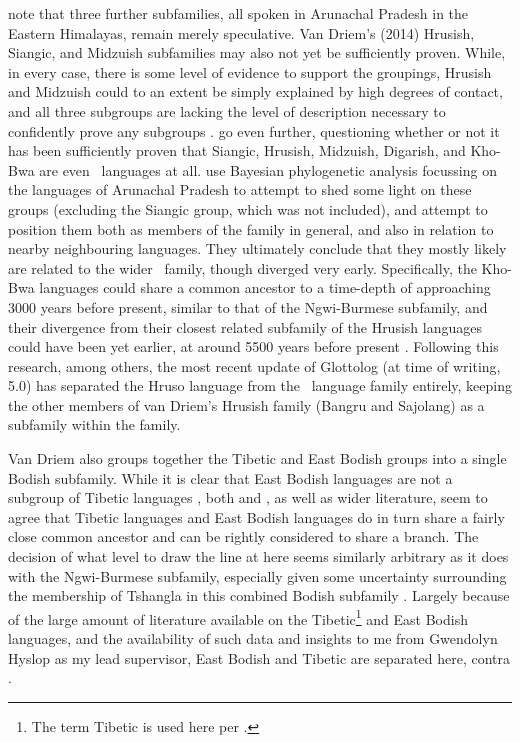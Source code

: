  note that three further subfamilies, all spoken in Arunachal Pradesh in the Eastern Himalayas, remain merely speculative. Van Driem's (2014) Hrusish, Siangic, and Midzuish subfamilies may also not yet be sufficiently proven. While, in every case, there is some level of evidence to support the groupings, Hrusish and Midzuish could to an extent be simply explained by high degrees of contact, and all three subgroups are lacking the level of description necessary to confidently prove any subgroups \cite{Post2017}.  go even further, questioning whether or not it has been sufficiently proven that Siangic, Hrusish, Midzuish, Digarish, and Kho-Bwa are even \lfam\ languages at all.  use Bayesian phylogenetic analysis focussing on the languages of Arunachal Pradesh to attempt to shed some light on these groups (excluding the Siangic group, which was not included), and attempt to position them both as members of the family in general, and also in relation to nearby neighbouring languages. They ultimately conclude that they mostly likely are related to the wider \lfam\ family, though diverged very early. Specifically, the Kho-Bwa languages could share a common ancestor to a time-depth of approaching 3000 years before present, similar to that of the Ngwi-Burmese subfamily, and their divergence from their closest related subfamily of the Hrusish languages could have been yet earlier, at around 5500 years before present \cite{Wu2022}. Following this research, among others, the most recent update of Glottolog (at time of writing, 5.0) \cite{glottolog} has separated the Hruso language from the \lfam\ language family entirely, keeping the other members of van Driem's Hrusish family (Bangru and Sajolang) as a subfamily within the family.

Van Driem \citeyear{VanDriem2014} also groups together the Tibetic and East Bodish groups into a single Bodish subfamily. While it is clear that East Bodish languages are not a subgroup of Tibetic languages \cite{Hyslop2017}, both  and , as well as wider literature, seem to agree that Tibetic languages and East Bodish languages do in turn share a fairly close common ancestor and can be rightly considered to share a branch. The decision of what level to draw the line at here seems similarly arbitrary as it does with the Ngwi-Burmese subfamily, especially given some uncertainty surrounding the membership of Tshangla in this combined Bodish subfamily \cite{Thurgood2017STIntro}. Largely because of the large amount of literature available on the Tibetic\footnote{The term Tibetic is used here per .} and East Bodish languages, and the availability of such data and insights to me from Gwendolyn Hyslop as my lead supervisor, East Bodish and Tibetic are separated here, contra . 

